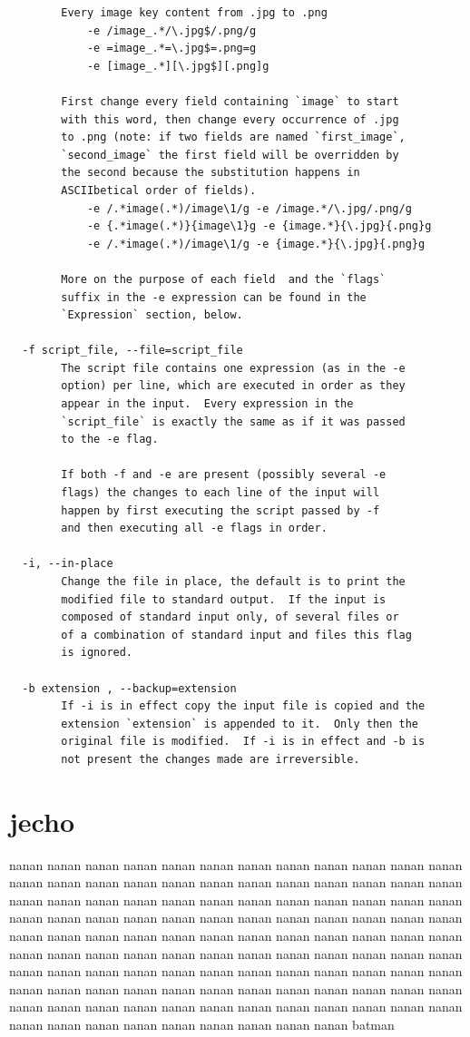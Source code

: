 \documentclass[11pt,a4paper,draft]{report}
\begin{document}
{\begin{verbatim}
        Every image key content from .jpg to .png
            -e /image_.*/\.jpg$/.png/g
            -e =image_.*=\.jpg$=.png=g
            -e [image_.*][\.jpg$][.png]g

        First change every field containing `image` to start
        with this word, then change every occurrence of .jpg
        to .png (note: if two fields are named `first_image`,
        `second_image` the first field will be overridden by
        the second because the substitution happens in
        ASCIIbetical order of fields).
            -e /.*image(.*)/image\1/g -e /image.*/\.jpg/.png/g
            -e {.*image(.*)}{image\1}g -e {image.*}{\.jpg}{.png}g
            -e /.*image(.*)/image\1/g -e {image.*}{\.jpg}{.png}g

        More on the purpose of each field  and the `flags`
        suffix in the -e expression can be found in the
        `Expression` section, below.

  -f script_file, --file=script_file
        The script file contains one expression (as in the -e
        option) per line, which are executed in order as they
        appear in the input.  Every expression in the
        `script_file` is exactly the same as if it was passed
        to the -e flag.

        If both -f and -e are present (possibly several -e
        flags) the changes to each line of the input will
        happen by first executing the script passed by -f
        and then executing all -e flags in order.

  -i, --in-place
        Change the file in place, the default is to print the
        modified file to standard output.  If the input is
        composed of standard input only, of several files or
        of a combination of standard input and files this flag
        is ignored.

  -b extension , --backup=extension
        If -i is in effect copy the input file is copied and the
        extension `extension` is appended to it.  Only then the
        original file is modified.  If -i is in effect and -b is
        not present the changes made are irreversible.
\end{verbatim}
}

\section{jecho}

nanan nanan nanan nanan nanan nanan nanan nanan nanan nanan nanan nanan nanan
nanan nanan nanan nanan nanan nanan nanan nanan nanan nanan nanan nanan nanan
nanan nanan nanan nanan nanan nanan nanan nanan nanan nanan nanan nanan nanan
nanan nanan nanan nanan nanan nanan nanan nanan nanan nanan nanan nanan nanan
nanan nanan nanan nanan nanan nanan nanan nanan nanan nanan nanan nanan nanan
nanan nanan nanan nanan nanan nanan nanan nanan nanan nanan nanan nanan nanan
nanan nanan nanan nanan nanan nanan nanan nanan nanan nanan nanan nanan nanan
nanan nanan nanan nanan nanan nanan nanan nanan nanan nanan nanan nanan nanan
nanan nanan nanan nanan nanan nanan nanan nanan nanan nanan nanan nanan nanan
batman
\end{document}
